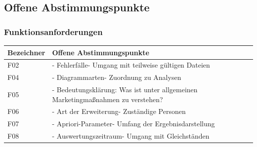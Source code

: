 \documentclass[a4paper,10pt]{article}
\begin{document}
        \subsection*{Offene Abstimmungspunkte}
        

        \subsubsection*{Funktionsanforderungen}
        \begin{longtable}{>{\raggedright\arraybackslash}p{}>{\raggedright\arraybackslash}p{}}

            \toprule
            \textbf{Bezeichner} & \textbf{Offene Abstimmungspunkte}                                                                                                                                          \\
            \midrule\endhead
            \bottomrule\endfoot
            F02                 & - Fehlerfälle\newline - Umgang mit teilweise gültigen Dateien                                                                                                              \\
            \midrule
            F04                 & - Diagrammarten\newline - Zuordnung zu Analysen                                                                                                                            \\
            \midrule
            F05 & - Bedeutungsklärung: Was ist unter allgemeinen Marketingma\ss{}nahmen zu verstehen? \\
            \midrule
            F06                 & - Art der Erweiterung\newline - Zuständige Personen                                                                                                                        \\
            \midrule
            F07                 & - Apriori-Parameter\newline - Umfang der Ergebnisdarstellung                                                                                                               \\
            \midrule
            F08                 & - Auswertungszeitraum\newline - Umgang mit Gleichständen                                                                               \\

\end{longtable}
\end{document}
